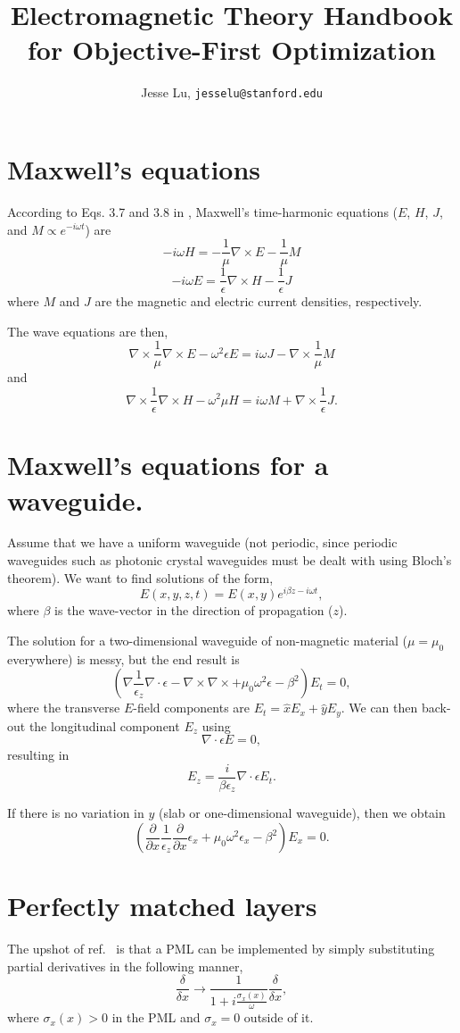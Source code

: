 \documentclass{article}
\title{Electromagnetic Theory Handbook for Objective-First Optimization}
\author{Jesse Lu, \texttt{jesselu@stanford.edu}}
\newcommand{\be}{\begin{equation}}
\newcommand{\ee}{\end{equation}}
\newcommand{\grad}{\nabla}
\newcommand{\dvg}{\nabla\cdot}
\newcommand{\curl}{\nabla\times}
\newcommand{\eps}{\epsilon}
\newcommand{\inv}{\frac{1}}
\newcommand{\del}{\partial}
\begin{document}
\maketitle
\tableofcontents

\section{Maxwell's equations}
According to Eqs. 3.7 and 3.8 in \cite{TH}, Maxwell's time-harmonic equations ($E$, $H$, $J$, and $M \propto e^{-i \omega t}$) are
\be -i \omega H = -\inv{\mu} \curl E - \inv{\mu} M \ee
\be -i \omega E = \inv{\eps} \curl H - \inv{\eps} J \ee
where $M$ and $J$ are the magnetic and electric current densities, respectively.

The wave equations are then,
\be \curl \inv{\mu} \curl E - \omega^2 \eps E = i \omega J - 
    \curl \inv{\mu} M \ee
    and
\be \curl \inv{\eps} \curl H - \omega^2 \mu H = i \omega M + 
    \curl \inv{\eps} J. \ee

\section{Maxwell's equations for a waveguide.}
Assume that we have a uniform waveguide (not periodic, since periodic waveguides such as photonic crystal waveguides must be dealt with using Bloch's theorem). We want to find solutions of the form,
\be E(x,y,z,t) = E(x,y)e^{i \beta z - i \omega t}, \ee
where $\beta$ is the wave-vector in the direction of propagation ($z$). 

The solution for a two-dimensional waveguide of non-magnetic material ($\mu = \mu_0$ everywhere) is messy\cite{WG}, but the end result is 
\be \left( \grad\inv{\eps_z}\dvg\eps - \curl\curl 
    + \mu_0\omega^2\eps - \beta^2 \right) E_t = 0, \ee
where the transverse $E$-field components are $E_t = \hat{x}E_x + \hat{y}E_y$.
We can then back-out the longitudinal component $E_z$ using
\be \dvg \eps E = 0, \ee
resulting in 
\be E_z = \frac{i}{\beta \eps_z} \dvg \eps E_t. \ee

If there is no variation in $y$ (slab or one-dimensional waveguide), 
then we obtain 
\be \left(\frac{\del}{\del x}\inv{\eps_z}\frac{\del}{\del x}\eps_x
    + \mu_0\omega^2\eps_x - \beta^2 \right) E_x = 0. \ee


\section{Perfectly matched layers}
The upshot of ref.~\cite{SJ} is that a PML can be implemented by simply substituting partial derivatives in the following manner,
\be \frac{\delta}{\delta x} \rightarrow
    \inv{1 + i\frac{\sigma_x(x)}{\omega}} \frac{\delta}{\delta x}, \ee
where $\sigma_x(x) > 0$ in the PML and $\sigma_x = 0$ outside of it.
\end{document}
